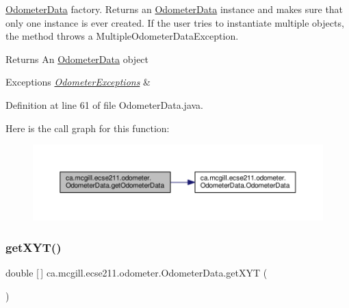 \hyperlink{classca_1_1mcgill_1_1ecse211_1_1odometer_1_1_odometer_data}{Odometer\+Data} factory. Returns an \hyperlink{classca_1_1mcgill_1_1ecse211_1_1odometer_1_1_odometer_data}{Odometer\+Data} instance and makes sure that only one instance is ever created. If the user tries to instantiate multiple objects, the method throws a Multiple\+Odometer\+Data\+Exception.

\begin{DoxyReturn}{Returns}
An \hyperlink{classca_1_1mcgill_1_1ecse211_1_1odometer_1_1_odometer_data}{Odometer\+Data} object 
\end{DoxyReturn}

\begin{DoxyExceptions}{Exceptions}
{\em \hyperlink{classca_1_1mcgill_1_1ecse211_1_1odometer_1_1_odometer_exceptions}{Odometer\+Exceptions}} & \\
\hline
\end{DoxyExceptions}


Definition at line 61 of file Odometer\+Data.\+java.

Here is the call graph for this function\+:
\nopagebreak
\begin{figure}[H]
\begin{center}
\leavevmode
\includegraphics[width=350pt]{classca_1_1mcgill_1_1ecse211_1_1odometer_1_1_odometer_data_afff2d760dd1f861b580f3eacef37f1cc_cgraph}
\end{center}
\end{figure}
\mbox{\label{classca_1_1mcgill_1_1ecse211_1_1odometer_1_1_odometer_data_a8f40f0264c68f0cbed4fff1723ae7863}} 
\subsubsection{\texorpdfstring{get\+X\+Y\+T()}{getXYT()}}
{\footnotesize\ttfamily double \mbox{[}$\,$\mbox{]} ca.\+mcgill.\+ecse211.\+odometer.\+Odometer\+Data.\+get\+X\+YT (\begin{DoxyParamCaption}{ }\end{DoxyParamCaption})}

